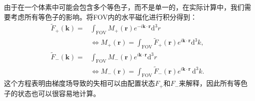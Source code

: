 由于在一个体素中可能会包含多个等色子，而不是单一的，在实际计算中，我们需要考虑所有等色子的影响。将FOV内的水平磁化进行积分得到：
\begin{align} \tilde{F}_+(\textbf{k})=&\int_{\mathrm{FOV}}M_+(\textbf{r})e^{-i\textbf{k} \cdot \textbf{r}}\mathrm{d}^3r \nonumber\\ &\Longleftrightarrow M_+(\textbf{r})=\int_{\mathrm{FOV}}\tilde{F}_+(\textbf{r})e^{i\textbf{k} \cdot \textbf{r}}\mathrm{d}^3k,\end{align}
 \begin{align} \tilde{F}_-(\textbf{k})=&\int_{\mathrm{FOV}}M_-(\textbf{r})e^{i\textbf{k} \cdot \textbf{r}}\mathrm{d}^3r\nonumber\\ &\Longleftrightarrow M_-(\textbf{r})=\int_{\mathrm{FOV}}\tilde{F}_-(\textbf{r})e^{i\textbf{k} \cdot \textbf{r}}\,\mathrm{d}^3k.\end{align}
 这个方程表明由梯度场导致的失相可以由配置状态$F_+$和$F_-$来解释，因此所有等色子的状态也可以很容易地计算。

